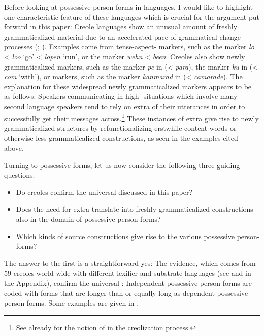\documentclass[output=paper]{langsci/langscibook}
\begin{document}
Before looking at possessive person-forms in  languages, I would like to highlight one characteristic feature of these languages which is crucial for the argument put forward in this paper: Creole languages show an unusual amount of freshly grammaticalized material due to an accelerated pace of grammatical change processes (\citealt{HaspelmathMichaelis2017}; \citealt{MichaelisHaspelmath2018}). Examples come from tense-aspect- markers, such as the    marker \textit{lo} < \textit{loo} ‘go’ <  \textit{lopen} ‘run’, or the   marker \textit{wehn} <  \textit{been}. Creoles also show newly grammaticalized  markers, such as the  marker \textit{pe} in  (<  \textit{para}), the  marker \textit{ku} in  (<  \textit{com} ‘with’), or  markers, such as the  marker \textit{kanmarad} in  (<  \textit{camarade}). The explanation for these widespread newly grammaticalized markers appears to be as follows: Speakers communicating in high- situations which involve many second language speakers tend to rely on extra  of their utterances in order to successfully get their messages across.\footnote{See already \citet{SeurenWekker1986} for the notion of  in the creolization process.} These instances of extra  give rise to newly grammaticalized structures by refunctionalizing erstwhile content words or otherwise less grammaticalized constructions, as seen in the examples cited above.

Turning to possessive forms, let us now consider the following three guiding questions: 

\begin{itemize}
\item Do creoles confirm the universal  discussed in this paper?
\item Does the need for extra  translate into freshly grammaticalized constructions also in the domain of possessive person-forms?
\item Which kinds of source constructions give rise to the various possessive person-forms?
\end{itemize}

The answer to the first  is a straightforward yes: The  evidence, which comes from 59 creoles world-wide with different lexifier and substrate languages (see \citealt{HaspelmathApics2013} and  in the Appendix), confirm the universal : Independent possessive person-forms are coded with forms that are longer than or equally long as dependent possessive person-forms. Some examples are given in . 
\end{document}
